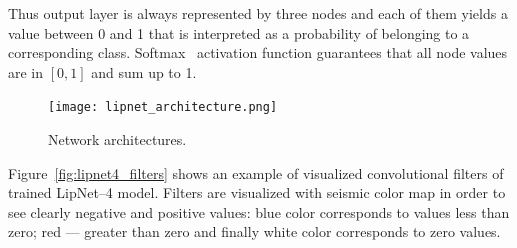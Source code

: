 \documentclass[a4paper, 11pt, table]{article}
\begin{document}
Thus output layer is always represented by three nodes and each of them yields a value between 0 and 1 that is interpreted as a probability of belonging to a corresponding class. Softmax~\cite{Bishop:2006:PRM:1162264} activation function guarantees that all node values are in $[0, 1]$ and sum up to 1. 





\begin{figure}[H]
\centering
\texttt{[image: lipnet\_architecture.png]} 
\caption{Network architectures.}
\label{fig:lipnet_arch}
\end{figure}

\newpage




Figure~\ref{fig:lipnet4_filters} shows an example of visualized convolutional filters of trained LipNet--4 model. Filters are visualized with seismic color map in order to see clearly negative and positive values: blue color corresponds to values less than zero; red --- greater than zero and finally white color corresponds to zero values. 
\end{document}
